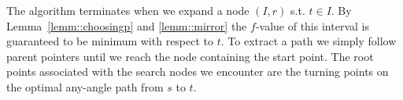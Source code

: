 

The algorithm terminates when we expand a node $(I, r)$ s.t.
$t \in I$. By Lemma~\ref{lemm::choosingp} and \ref{lemm::mirror} 
the $f$-value of this
interval is guaranteed to be minimum with respect to $t$.
To extract a path we simply follow parent pointers until we
reach the node containing the start point.
The root points associated with the search nodes we encounter
are the turning points on the optimal any-angle path from 
$s$ to $t$. 

